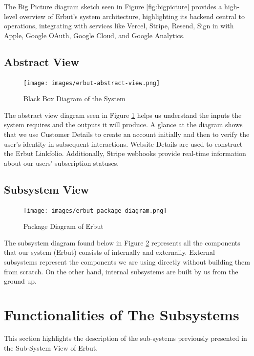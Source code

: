 \documentclass[a4paper]{report}
\begin{document}
The Big Picture diagram sketch seen in Figure \ref{fig:bigpicture} provides a high-level overview of Erbut’s system architecture, highlighting its backend central to operations, integrating with services like Vercel, Stripe, Resend, Sign in with Apple, Google OAuth, Google Cloud, and Google Analytics.

\section{Abstract View}

\begin{figure}[h!]
    \centering
    \texttt{[image: images/erbut-abstract-view.png]}
    \caption{Black Box Diagram of the System}
    \label{fig:abstractview}
\end{figure}

The abstract view diagram seen in Figure \ref{fig:abstractview} helps us understand the inputs the system requires and the outputs it will produce. A glance at the diagram shows that we use Customer Details to create an account initially and then to verify the user's identity in subsequent interactions. Website Details are used to construct the Erbut Linkfolio. Additionally, Stripe webhooks provide real-time information about our users’ subscription statuses.

\section{Subsystem View}

\begin{figure}[h!]
    \centering
    \texttt{[image: images/erbut-package-diagram.png]}
    \caption{Package Diagram of Erbut}
    \label{fig:subsystemview}
\end{figure}

The subsystem diagram found below in Figure \ref{fig:subsystemview} represents all the components that our system (Erbut) consists of internally and externally. External subsystems represent the components we are using directly without building them from scratch. On the other hand, internal subsystems are built by us from the ground up.

\chapter{Functionalities of The Subsystems}

This section highlights the description of the sub-systems previously presented in the Sub-System View of Erbut.
\end{document}
